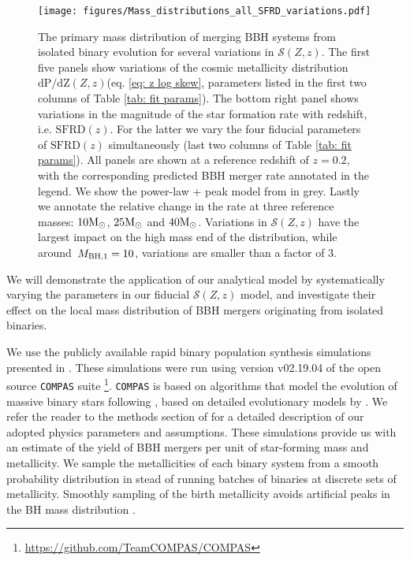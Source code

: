 \documentclass[twocolumn]{aastex631}
\newcommand{\Msun}{\ensuremath{\rm{M}_{\odot}}\xspace}
\newcommand{\Mbheen}{\ensuremath{\,M_{\rm BH, 1}}\xspace}
\newcommand{\SFRDzZ}{\ensuremath{\mathcal{S}(Z,z)}\xspace}
\newcommand{\SFRDz}{\ensuremath{\mathrm{SFRD}(z)}\xspace}
\newcommand{\dpdZ}{\ensuremath{\mathrm{dP/dZ}(Z,z)}\xspace}
\newcommand{\COMPAS}{{\tt COMPAS}\xspace}
\begin{document}
\begin{figure*}
\centering
{}
\texttt{[image: figures/Mass\_distributions\_all\_SFRD\_variations.pdf]}
\caption{The primary mass distribution of merging BBH systems from isolated binary evolution for several variations in \SFRDzZ. 
The first five panels show variations of the cosmic metallicity distribution  \dpdZ (eq. \ref{eq: z log skew}, parameters listed in the first two columns of Table \ref{tab: fit params}). The bottom right panel shows variations in the magnitude of the star formation rate with redshift, i.e. \SFRDz. For the latter we vary the four fiducial parameters of \SFRDz simultaneously (last two columns of Table \ref{tab: fit params}). All panels are shown at a reference redshift of $z=0.2$, with the corresponding predicted BBH merger rate annotated in the legend. We show the power-law + peak model from \protect\cite{GWTC3_popPaper2021} in grey. Lastly we annotate the relative change in the rate at three reference masses: $10\Msun$, $25\Msun$ and $40\Msun$. Variations in \SFRDzZ have the largest impact on the high mass end of the distribution, while around $\Mbheen=10$, variations are smaller than a factor of 3.  
  \label{fig: mass dists}}
\end{figure*}

We will demonstrate the application of our analytical model by systematically varying the parameters in our fiducial \SFRDzZ model, and investigate their effect on the local mass distribution of BBH mergers originating from isolated binaries. 


We use the publicly available rapid binary population synthesis simulations presented in \cite{vanson+2022}. 
These simulations were run using version v02.19.04 of the open source \COMPAS suite \citep{COMPAS_method} \footnote{\url{https://github.com/TeamCOMPAS/COMPAS}}. \COMPAS is based on algorithms that model the evolution of massive binary stars following \citet{Hurley+2000, Hurley+2002}, based on detailed evolutionary models by \citet{Pols+1998}.  We refer the reader to the methods section of \cite{vanson+2022} for a detailed description of our adopted physics parameters and assumptions.
%
These simulations provide us with an estimate of the yield of BBH mergers per unit of star-forming mass and metallicity. 
We sample the metallicities of each binary system from a smooth probability distribution in stead of running batches of binaries at discrete sets of metallicity. Smoothly sampling of the birth metallicity avoids artificial peaks in the BH mass distribution \citep[e.g.][]{Dominik2015,Kummer_thesis}. 
\end{document}
